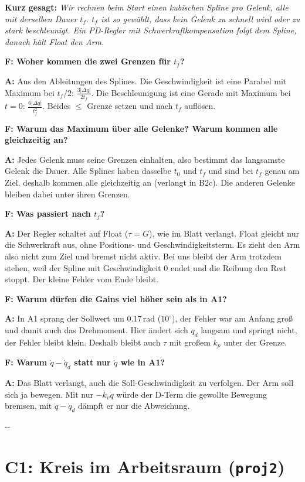 \documentclass[10pt,a4paper]{article}
\makeatletter
\newcommand{\secneed}[1]{\par\penalty\@M\begingroup\setlength{\dimen@}{#1}\dimen@ii\pagegoal
  \advance\dimen@ii-\pagetotal\ifdim\dimen@>\dimen@ii\ifdim\dimen@ii>\z@\vfil\fi\penalty-\@M\fi\endgroup}
\let\oldsection\section
\renewcommand{\section}{\secneed{9\baselineskip}\oldsection}
\newcommand{\frage}[2]{\textbf{F: #1}\par\nopagebreak\vspace{1pt}\textbf{A:} #2\par\vspace{5pt}}
\newcommand{\sagen}[1]{\textbf{Kurz gesagt:} \emph{#1}\par}
\newcommand{\code}[1]{\texttt{#1}}
\makeatother
\begin{document}
\sagen{Wir rechnen beim Start einen kubischen Spline pro Gelenk, alle mit derselben Dauer $t_f$. $t_f$ ist so gewählt, dass
kein Gelenk zu schnell wird oder zu stark beschleunigt. Ein PD-Regler mit Schwerkraftkompensation folgt dem Spline, danach
hält Float den Arm.}

\begin{fragen}
\frage{Woher kommen die zwei Grenzen für $t_f$?}
{Aus den Ableitungen des Splines. Die Geschwindigkeit ist eine Parabel mit Maximum bei $t_f/2$:
$\frac{3|\Delta q|}{2t_f}$. Die Beschleunigung ist eine Gerade mit Maximum bei $t = 0$: $\frac{6|\Delta q|}{t_f^2}$. Beides
$\le$ Grenze setzen und nach $t_f$ auflösen.}
\frage{Warum das Maximum über alle Gelenke? Warum kommen alle gleichzeitig an?}
{Jedes Gelenk muss seine Grenzen einhalten, also bestimmt das langsamste Gelenk die Dauer. Alle Splines haben dasselbe
$t_0$ und $t_f$ und sind bei $t_f$ genau am Ziel, deshalb kommen alle gleichzeitig an (verlangt in B2c). Die anderen Gelenke
bleiben dabei unter ihren Grenzen.}
\frage{Was passiert nach $t_f$?}
{Der Regler schaltet auf Float ($\tau = G$), wie im Blatt verlangt. Float gleicht nur die Schwerkraft aus, ohne Positions- und Geschwindigkeitsterm. Es zieht den Arm also nicht zum Ziel und bremst nicht aktiv. Bei uns bleibt der Arm trotzdem stehen, weil der Spline mit Geschwindigkeit 0 endet und die Reibung den Rest stoppt. Der kleine Fehler vom Ende bleibt.}
\frage{Warum dürfen die Gains viel höher sein als in A1?}
{In A1 sprang der Sollwert um $0.17$\,rad ($10^\circ$), der Fehler war am Anfang groß und damit auch das Drehmoment. Hier ändert sich
$q_d$ langsam und springt nicht, der Fehler bleibt klein. Deshalb bleibt auch $\tau$ mit großem $k_p$ unter der Grenze.}
\frage{Warum $\dot q - \dot q_d$ statt nur $\dot q$ wie in A1?}
{Das Blatt verlangt, auch die Soll-Geschwindigkeit zu verfolgen. Der Arm soll sich ja bewegen. Mit nur $-k_v\dot q$ würde der
D-Term die gewollte Bewegung bremsen, mit $\dot q - \dot q_d$ dämpft er nur die Abweichung.}
\end{fragen}

\section{C1: Kreis im Arbeitsraum (\code{proj2})}
\end{document}
